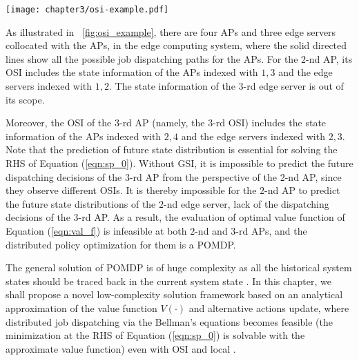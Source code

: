 \begin{figure*}[htp!]
    \centering
    \texttt{[image: chapter3/osi-example.pdf]}
    \caption{An example of system model, where the edge servers $1,2,3$ are collocated with the APs $1,2,4$, respectively.}
    \label{fig:osi_example}
\end{figure*}

\begin{example}
    As illustrated in \figurename~\ref{fig:osi_example}, there are four APs and three edge servers collocated with the APs, in the edge computing system, where the solid directed lines show all the possible job dispatching paths for the APs.
    For the $2$-nd AP, its OSI includes the state information of the APs indexed with $1,3$ and the edge servers indexed with $1,2$.
    The state information of the $3$-rd edge server is out of its scope.
    
    Moreover, the OSI of the $3$-rd AP (namely, the $3$-rd OSI) includes the state information of the APs indexed with $2,4$ and the edge servers indexed with $2,3$.
    Note that the prediction of future state distribution is essential for solving the RHS of Equation (\ref{eqn:sp_0}).
    Without GSI, it is impossible to predict the future dispatching decisions of the $3$-rd AP from the perspective of the $2$-nd AP, since they observe different OSIs.
    It is thereby impossible for the $2$-nd AP to predict the future state distributions of the $2$-nd edge server, lack of the dispatching decisions of the $3$-rd AP.
    As a result, the evaluation of optimal value function of Equation (\ref{eqn:val_f}) is infeasible at both $2$-nd and $3$-rd APs, and the distributed policy optimization for them is a POMDP.
\end{example}

The general solution of POMDP is of huge complexity {as all the historical system states should be traced back in the current system state} \cite{IJCAI03-NairR,IJCAI99-BoutilierC}.
In this chapter, we shall propose a novel low-complexity solution framework based on an analytical approximation of the value function $V(\cdot)$ and alternative actions update, where distributed job dispatching via the Bellman's equations becomes feasible
(the minimization at the RHS of Equation (\ref{eqn:sp_0}) is solvable with the approximate value function)
even with OSI and local {\brlatency}.


